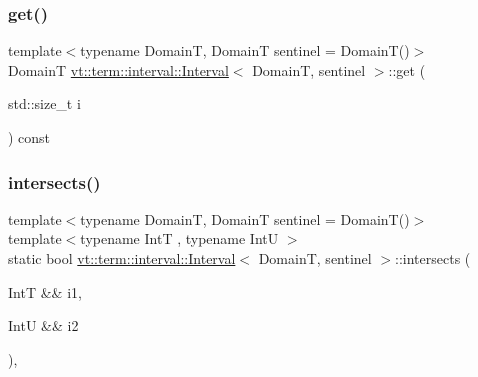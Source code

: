 \subsubsection{\texorpdfstring{get()}{get()}}
{\footnotesize\ttfamily template$<$typename DomainT, DomainT sentinel = Domain\+T()$>$ \\
DomainT \hyperlink{structvt_1_1term_1_1interval_1_1_interval}{vt\+::term\+::interval\+::\+Interval}$<$ DomainT, sentinel $>$\+::get (\begin{DoxyParamCaption}\item[{std\+::size\+\_\+t}]{i }\end{DoxyParamCaption}) const\hspace{0.3cm}{\ttfamily [inline]}}

\mbox{\label{structvt_1_1term_1_1interval_1_1_interval_aa9ce87dd0605710869be8d9c12547d2c}} 
\subsubsection{\texorpdfstring{intersects()}{intersects()}}
{\footnotesize\ttfamily template$<$typename DomainT, DomainT sentinel = Domain\+T()$>$ \\
template$<$typename IntT , typename IntU $>$ \\
static bool \hyperlink{structvt_1_1term_1_1interval_1_1_interval}{vt\+::term\+::interval\+::\+Interval}$<$ DomainT, sentinel $>$\+::intersects (\begin{DoxyParamCaption}\item[{IntT \&\&}]{i1,  }\item[{IntU \&\&}]{i2 }\end{DoxyParamCaption})\hspace{0.3cm}{\ttfamily [inline]}, {\ttfamily [static]}}

\mbox{\label{structvt_1_1term_1_1interval_1_1_interval_ab39108ee4b0837f74bcbc8fe456dedac}} 
